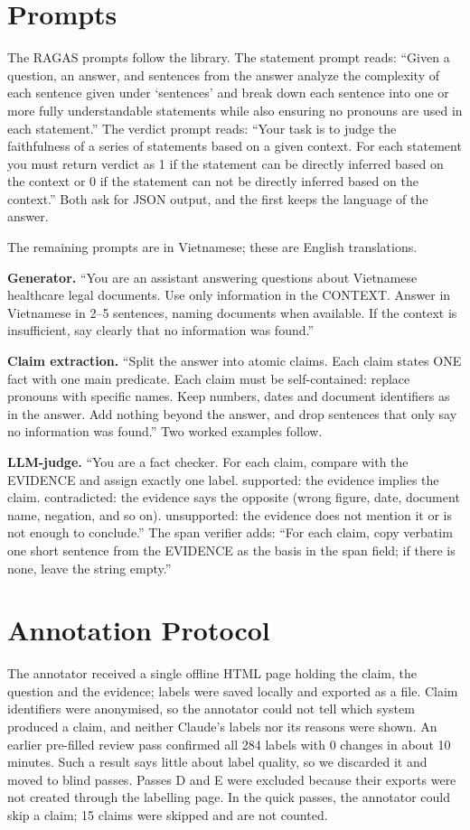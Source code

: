 \documentclass[conference]{IEEEtran}
\begin{document}
\appendices

\section{Prompts}
The RAGAS prompts follow the library. The statement prompt reads: ``Given a question, an answer, and sentences from the answer analyze the complexity of each sentence given under `sentences' and break down each sentence into one or more fully understandable statements while also ensuring no pronouns are used in each statement.'' The verdict prompt reads: ``Your task is to judge the faithfulness of a series of statements based on a given context. For each statement you must return verdict as 1 if the statement can be directly inferred based on the context or 0 if the statement can not be directly inferred based on the context.'' Both ask for JSON output, and the first keeps the language of the answer.

The remaining prompts are in Vietnamese; these are English translations.

\textbf{Generator.} ``You are an assistant answering questions about Vietnamese healthcare legal documents. Use only information in the CONTEXT. Answer in Vietnamese in 2--5 sentences, naming documents when available. If the context is insufficient, say clearly that no information was found.''

\textbf{Claim extraction.} ``Split the answer into atomic claims. Each claim states ONE fact with one main predicate. Each claim must be self-contained: replace pronouns with specific names. Keep numbers, dates and document identifiers as in the answer. Add nothing beyond the answer, and drop sentences that only say no information was found.'' Two worked examples follow.

\textbf{LLM-judge.} ``You are a fact checker. For each claim, compare with the EVIDENCE and assign exactly one label. supported: the evidence implies the claim. contradicted: the evidence says the opposite (wrong figure, date, document name, negation, and so on). unsupported: the evidence does not mention it or is not enough to conclude.'' The span verifier adds: ``For each claim, copy verbatim one short sentence from the EVIDENCE as the basis in the span field; if there is none, leave the string empty.''

\section{Annotation Protocol}
The annotator received a single offline HTML page holding the claim, the question and the evidence; labels were saved locally and exported as a file. Claim identifiers were anonymised, so the annotator could not tell which system produced a claim, and neither Claude's labels nor its reasons were shown. An earlier pre-filled review pass confirmed all 284 labels with 0 changes in about 10 minutes. Such a result says little about label quality, so we discarded it and moved to blind passes. Passes D and E were excluded because their exports were not created through the labelling page. In the quick passes, the annotator could skip a claim; 15 claims were skipped and are not counted.
\end{document}
